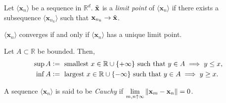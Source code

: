 \begin{defn}
    Let $\langle \mathbf{x}_n \rangle$ be a sequence in $\mathbb{R}^d$. $\Tilde{\mathbf{x}}$ is a \emph{limit point} of $\langle \mathbf{x}_n \rangle$ if there exists a subsequence $\langle \mathbf{x}_{n_k} \rangle$ such that $\mathbf{x}_{n_k} \to \Tilde{\mathbf{x}}$.
\end{defn}

\begin{prop}
    $\langle \mathbf{x}_n \rangle$ converges if and only if $\langle \mathbf{x}_n \rangle$ has a unique limit point.    
\end{prop}

\begin{defn}
    Let $A \subset \mathbb{R}$ be bounded. Then, 
    \begin{align*}
        \sup A &\vcentcolon= \text{ smallest } x \in \mathbb{R} \cup \{+\infty\} \text{ such that } y \in A \implies y \leq x, \\
        \inf A &\vcentcolon= \text{ largest } x \in \mathbb{R} \cup \{-\infty\} \text{ such that } y \in A \implies y \geq x.
    \end{align*}
\end{defn}

\begin{defn}
    A sequence $\langle \mathbf{x}_n \rangle$ is said to be \emph{Cauchy} if $\displaystyle\lim_{m,n \uparrow \infty} \norm{\mathbf{x}_m - \mathbf{x}_n} = 0$.
\end{defn}

